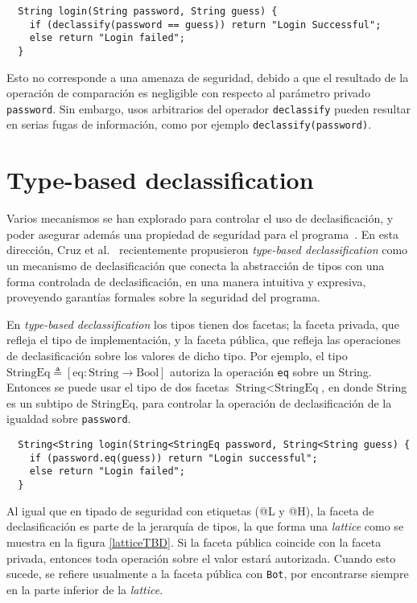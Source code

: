 \begin{lstlisting}
  String login(String password, String guess) {
    if (declassify(password == guess)) return "Login Successful";
    else return "Login failed";
  }
\end{lstlisting}

Esto no corresponde a una amenaza de seguridad, debido a que el resultado de la operación de comparación es negligible con respecto al parámetro privado \texttt{password}. Sin embargo, usos arbitrarios del operador \texttt{declassify} pueden resultar en serias fugas de información, como por ejemplo \texttt{declassify(password)}.
\section{Type-based declassification}
Varios mecanismos se han explorado para controlar el uso de declasificación, y poder asegurar además una propiedad de seguridad para el programa~\cite{sabelfeldSands:JCS09}. En esta dirección, Cruz et al.~\cite{cruzAl:ecoop2017} recientemente propusieron \textit{type-based declassification} como un mecanismo de declasificación que conecta la abstracción de tipos con una forma controlada de declasificación, en una manera intuitiva y expresiva, proveyendo garantías formales sobre la seguridad del programa.

En \textit{type-based declassification} los tipos tienen dos facetas; la faceta privada, que refleja el tipo de implementación, y la faceta pública, que refleja las operaciones de declasificación sobre los valores de dicho tipo. Por ejemplo, el tipo $\text{StringEq} \triangleq [\text{eq} : \text{String} \rightarrow \text{Bool}]$ autoriza la operación \texttt{eq} sobre un String. Entonces se puede usar el tipo de dos facetas $\text{String} < \text{StringEq}$, en donde String es un subtipo de StringEq, para controlar la operación de declasificación de la igualdad sobre \texttt{password}.

\begin{lstlisting}
  String<String login(String<StringEq password, String<String guess) {
  	if (password.eq(guess)) return "Login successful";
  	else return "Login failed";
  }
\end{lstlisting}

Al igual que en tipado de seguridad con etiquetas (@L y @H), la faceta de declasificación es parte de la jerarquía de tipos, la que forma una \textit{lattice} como se muestra en la figura \ref{latticeTBD}. Si la faceta pública coincide con la faceta privada, entonces toda operación sobre el valor estará autorizada. Cuando esto sucede, se refiere usualmente a la faceta pública con \texttt{Bot}, por encontrarse siempre en la parte inferior de la \textit{lattice}.

